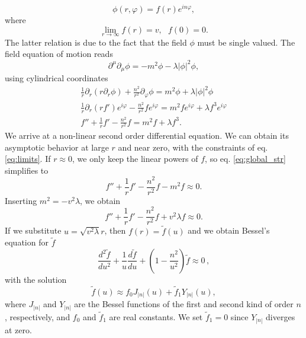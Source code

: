 \begin{equation}
	\phi(r,\varphi) = f(r)e^{in\varphi},
\end{equation}
where 
\begin{equation}
	\lim_{r\to\infty}f(r) = v,\ \ \ f(0) = 0.
	\label{eq:limits} 
\end{equation}
The latter relation is due to the fact that the field $\phi$ must be single valued. The field equation of motion reads
\begin{equation}
	\partial^{\mu}\partial_{\mu}\phi = -m^2\phi -\lambda |\phi|^2 \phi ,
\end{equation}
using cylindrical coordinates
\begin{eqnarray}
	\frac{1}{r} \partial_{r} (r\partial_{r}\phi) + \frac{n^2}{r^2}\partial_{\varphi} \phi = m^2 \phi + \lambda |\phi|^2 \phi \nonumber \\
	\frac{1}{r} \partial_{r} (r f')e^{i\varphi} - \frac{n^2}{r^2} f e^{i\varphi} = m^2 fe^{i\varphi} + \lambda f^3 e^{i\varphi} \nonumber \\
	\label{eq:global_str}
	f'' + \frac{1}{r}f'- \frac{n^2}{r^2} f = m^2 f+ \lambda f^3.
\end{eqnarray}
We arrive at a non-linear second order differential equation. We can obtain its asymptotic behavior at large $r$ and near zero, with the constraints of eq. \eqref{eq:limits}.
If $r\approx 0$, we only keep the linear powers of $f$, so eq. \eqref{eq:global_str} simplifies to
\begin{equation}
	f'' + \frac{1}{r}f'- \frac{n^2}{r^2} f -m^2 f\approx  0.
\end{equation}
Inserting $m^2 = -v^2\lambda$, we obtain
\begin{equation}
	f'' + \frac{1}{r}f'- \frac{n^2}{r^2} f + v^2\lambda f\approx  0.
\end{equation}
If we substitute $u=\sqrt{v^2\lambda}r$, then $f(r) = \tilde{f}(u)$ and we obtain Bessel's equation for $\tilde f$
\begin{equation}
	\frac{d^2\tilde f}{du^2} + \frac{1}{u}\frac{d\tilde f}{du}+\left(1- \frac{n^2}{u^2}\right) \tilde f\approx  0\, ,
\end{equation}
with the solution
\begin{equation}
	\tilde f(u) \approx  f_0 J_{|n|}(u) +  \tilde f_1 Y_{|n|}(u),
\end{equation}
where $J_{|n|}$ and $Y_{|n|}$ are the Bessel functions of the first and second kind of order $n$, respectively, and $f_0$ and $\tilde f_1$ are real constants. We set $\tilde f_1=0$ since $Y_{|n|}$ diverges at zero.
